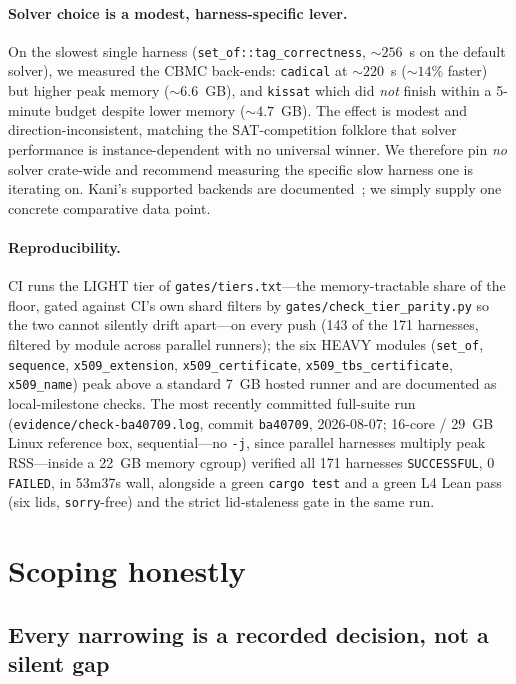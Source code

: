 \documentclass[10pt,twocolumn]{article}
\newcommand{\code}[1]{\texttt{\small #1}}
\begin{document}
\paragraph{Solver choice is a modest, harness-specific lever.}
On the slowest single harness (\code{set\_of::tag\_correctness},
${\sim}256$~s on the default solver), we measured the CBMC back-ends:
\code{cadical} at ${\sim}220$~s (${\sim}14\%$ faster) but higher peak memory
(${\sim}6.6$~GB), and \code{kissat} which did \emph{not} finish within a
5-minute budget despite lower memory (${\sim}4.7$~GB). The effect is modest and
direction-inconsistent, matching the SAT-competition folklore that solver
performance is instance-dependent with no universal winner. We therefore pin
\emph{no} solver crate-wide and recommend measuring the specific slow harness
one is iterating on. Kani's supported backends are documented~\cite{kani};
we simply supply one concrete comparative data point.

\paragraph{Reproducibility.}
CI runs the LIGHT tier of \code{gates/tiers.txt}---the memory-tractable share
of the floor, gated against CI's own shard filters by
\code{gates/check\_tier\_parity.py} so the two cannot silently drift apart---on
every push (143 of the 171 harnesses, filtered by module across parallel
runners); the six HEAVY modules (\code{set\_of}, \code{sequence},
\code{x509\_extension}, \code{x509\_certificate}, \code{x509\_tbs\_certificate},
\code{x509\_name}) peak above a standard 7~GB hosted runner and are documented
as local-milestone checks. The most recently committed full-suite run
(\code{evidence/check-ba40709.log}, commit \code{ba40709}, 2026-08-07; 16-core
/ 29~GB Linux reference box, sequential---no \code{-j}, since parallel
harnesses multiply peak RSS---inside a 22~GB memory cgroup) verified all 171
harnesses \code{SUCCESSFUL}, 0 \code{FAILED}, in 53m37s wall, alongside a green
\code{cargo test} and a green L4 Lean pass (six lids, \code{sorry}-free) and
the strict lid-staleness gate in the same run.

\section{Scoping honestly}
\label{sec:scope}

\subsection{Every narrowing is a recorded decision, not a silent gap}
\end{document}
